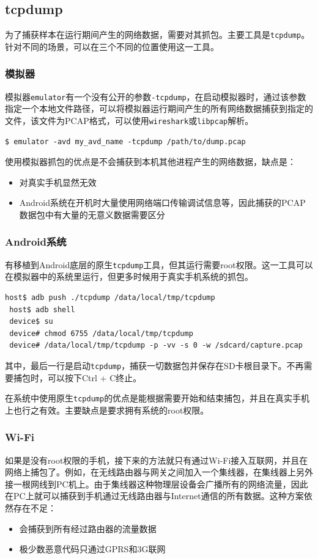 \subsection{tcpdump}
为了捕获样本在运行期间产生的网络数据，需要对其抓包。主要工具是\lstinline!tcpdump!。针对不同的场景，可以在三个不同的位置使用这一工具。

\subsubsection{模拟器}
模拟器\lstinline!emulator!有一个没有公开的参数\lstinline!-tcpdump!，在启动模拟器时，通过该参数指定一个本地文件路径，可以将模拟器运行期间产生的所有网络数据捕获到指定的文件，该文件为PCAP格式，可以使用\lstinline!wireshark!或\lstinline!libpcap!解析。
\begin{lstlisting}[numbers=none]
 $ emulator -avd my_avd_name -tcpdump /path/to/dump.pcap
\end{lstlisting}
使用模拟器抓包的优点是不会捕获到本机其他进程产生的网络数据，缺点是：
\begin{itemize}
  \item 对真实手机显然无效
  \item Android系统在开机时大量使用网络端口传输调试信息等，因此捕获的PCAP数据包中有大量的无意义数据需要区分
\end{itemize}

\subsubsection{Android系统}
有移植到Android底层的原生\lstinline!tcpdump!工具，但其运行需要root权限。这一工具可以在模拟器中的系统里运行，但更多时候用于真实手机系统的抓包。
\begin{lstlisting}[numbers=none]
 host$ adb push ./tcpdump /data/local/tmp/tcpdump
 host$ adb shell
 device$ su
 device# chmod 6755 /data/local/tmp/tcpdump
 device# /data/local/tmp/tcpdump -p -vv -s 0 -w /sdcard/capture.pcap
\end{lstlisting}
其中，最后一行是启动\lstinline!tcpdump!，捕获一切数据包并保存在SD卡根目录下。不再需要捕包时，可以按下Ctrl + C终止。

在系统中使用原生\lstinline!tcpdump!的优点是能根据需要开始和结束捕包，并且在真实手机上也行之有效。主要缺点是要求拥有系统的root权限。

\subsubsection{Wi-Fi}
如果是没有root权限的手机，接下来的方法就只有通过Wi-Fi接入互联网，并且在网络上捕包了。例如，在无线路由器与网关之间加入一个集线器，在集线器上另外接一根网线到PC机上。由于集线器这种物理层设备会广播所有的网络流量，因此在PC上就可以捕获到手机通过无线路由器与Internet通信的所有数据。这种方案依然存在不足：
\begin{itemize}
  \item 会捕获到所有经过路由器的流量数据
  \item 极少数恶意代码只通过GPRS和3G联网
\end{itemize}

